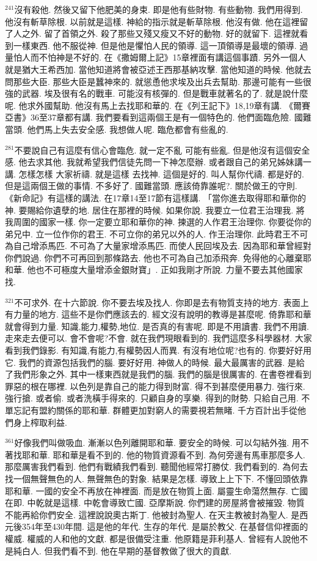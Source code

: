\documentclass{book}
\begin{document}
$^{241}$沒有殺他.
然後又留下他肥美的身束.
即是他有些財物.
有些動物.
我們用得到.
他沒有斬草除根.
以前就是這樣.
神給的指示就是斬草除根.
他沒有做.
他在這裡留了人之外.
留了首領之外.
殺了那些又殘又瘦又不好的動物.
好的就留下.
這裡就看到一樣東西.
他不服從神.
但是他是懼怕人民的領導.
這一頂領導是最壞的領導.
過量怕人而不怕神是不好的.
在《撒姆爾上記》15章裡面有講這個事蹟.
另外一個人就是猶大王希西加.
當他知道將會被亞述王西那基納攻擊.
當他知道的時候.
他就去問那些大臣.
那些大臣是蠶神來的.
就慫恿他求埃及出兵去幫助.
那邊可能有一些很強的武器.
埃及很有名的戰車.
可能沒有核彈的.
但是戰車就著名的了.
就是說什麼呢.
他求外國幫助.
他沒有馬上去找耶和華的.
在《列王記下》18,19章有講.
《爾賽亞書》36至37章都有講.
我們要看到這兩個王是有一個特色的.
他們面臨危險.
國難當頭.
他們馬上失去安全感.
我想做人呢.
臨危都會有些亂的.

$^{281}$不要說自己有這麼有信心會臨危.
就一定不亂 可能有些亂.
但是他沒有這個安全感.
他去求其他.
我就希望我們信徒先問一下神怎麼辦.
或者跟自己的弟兄姊妹講一講.
怎樣怎樣 大家祈禱.
就是這樣 去找神.
這個是好的.
叫人幫你代禱.
都是好的.
但是這兩個王做的事情.
不多好了.
國難當頭.
應該倚靠誰呢?.
關於做王的守則.
《新命記》有這樣的講法.
在17章14至17節有這樣講.
「當你進去取得耶和華你的神.
要賜給你遺孽的地.
居住在那裡的時候.
如果你說.
我要立一位君王治理我.
將我周圍的國家一樣.
你一定要立耶和華你的神.
揀選的人作君王治理你.
你要從你的弟兄中.
立一位作你的君王.
不可立你的弟兄以外的人.
作王治理你.
此時君王不可為自己增添馬匹.
不可為了大量家增添馬匹.
而使人民回埃及去.
因為耶和華曾經對你們說過.
你們不可再回到那條路去.
他也不可為自己加添飛奔.
免得他的心離棄耶和華.
他也不可極度大量增添金銀財寶」.
正如我剛才所說.
力量不要去其他國家找.

$^{321}$不可求外.
在十六節說.
你不要去埃及找人.
你即是去有物質支持的地方.
表面上有力量的地方.
這些不是你們應該去的.
經文沒有說明的教導是甚麼呢.
倚靠耶和華就會得到力量.
知識,能力,權勢,地位.
是否真的有害呢.
即是不用讀書.
我們不用讀.
走來走去便可以.
會不會呢?不會.
就在我們現眼看到的.
我們這麼多科學器材.
大家看到我們錄影.
有知識,有能力,有權勢因人而異.
有沒有地位呢?也有的.
你要好好用它.
我們的資源包括我們的腦.
要好好用.
神做人的時候.
最大最厲害的武器.
是給了我們形象之外.
其中一樣東西就是我們的腦.
我們的腦是很厲害的.
在書卷裡看到罪惡的根在哪裡.
以色列是靠自己的能力得到財富.
得不到甚麼便用暴力.
強行來.
強行搶.
或者偷.
或者洗橫手得來的.
只顧自身的享樂.
得到的財勢.
只給自己用.
不單忘記有盟約關係的耶和華.
群體更加對窮人的需要視若無睹.
千方百計出手從他們身上榨取利益.

$^{361}$好像我們叫做吸血.
漸漸以色列離開耶和華.
要安全的時候.
可以勾結外強.
用不著找耶和華.
耶和華是看不到的.
他的物質資源看不到.
為何旁邊有馬車那麼多人.
那麼厲害我們看到.
他們有戰績我們看到.
聽聞他經常打勝仗.
我們看到的.
為何去找一個無聲無色的人.
無聲無色的對象.
結果是怎樣.
導致上上下下.
不懂回頭依靠耶和華.
一國的安全不再放在神裡面.
而是放在物質上面.
屬靈生命蕩然無存.
亡國在即.
中乾就是這樣.
中乾會導致亡國.
亞摩斯說.
你們建的房屋將會被摧毀.
物質不能再給你們安全.
這裡說說奧古斯丁.
他被封為聖人.
在天主教被封為聖人.
是西元後354年至430年間.
這是他的年代.
生存的年代.
是屬於教父.
在基督信仰裡面的權威.
權威的人和他的文獻.
都是很備受注重.
他原籍是菲利基人.
曾經有人說他不是純白人.
但我們看不到.
他在早期的基督教做了很大的貢獻.
\end{document}

